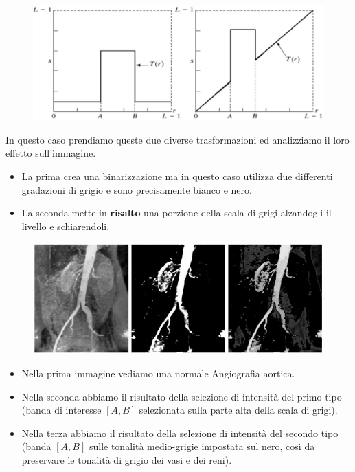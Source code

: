 \begin{figure}[H]
    \centering
    \includegraphics[width=\linewidth, keepaspectratio]{capitoli/immagini/imgs/trasformazioni_lineari_esempio_7.jpg}
\end{figure}

In questo caso prendiamo queste due diverse trasformazioni ed analizziamo il
loro effetto sull'immagine.

\begin{itemize}
    \item La prima crea una binarizzazione ma in questo caso utilizza due
          differenti gradazioni di grigio e sono precisamente bianco e nero.
    \item La seconda mette in \textbf{risalto} una porzione della scala di grigi
          alzandogli il livello e schiarendoli.
\end{itemize}

\begin{figure}[H]
    \centering
    \includegraphics[width=\linewidth, keepaspectratio]{capitoli/immagini/imgs/angiografie_esempio_7.jpg}
\end{figure}

\begin{itemize}
    \item Nella prima immagine vediamo una normale Angiografia aortica.
    \item Nella seconda abbiamo il risultato della selezione di intensità del
          primo tipo (banda di interesse $[A, B]$ selezionata sulla parte alta
          della scala di grigi).
    \item Nella terza abbiamo il risultato della selezione di intensità del
          secondo tipo (banda $[A, B]$ sulle tonalità medio-grigie impostata sul
          nero, così da preservare le tonalità di grigio dei vasi e dei reni).
\end{itemize}

